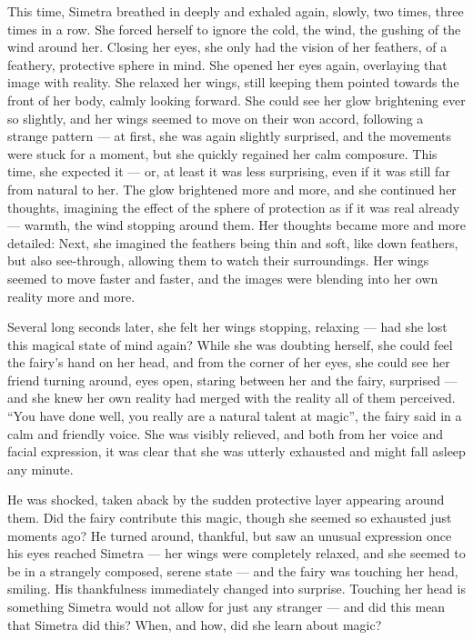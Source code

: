 This time, Simetra breathed in deeply and exhaled again, slowly, two times, three times in a row. She forced herself to ignore the cold, the wind, the gushing of the wind around her. Closing her eyes, she only had the vision of her feathers, of a feathery, protective sphere in mind. She opened her eyes again, overlaying that image with reality. She relaxed her wings, still keeping them pointed towards the front of her body, calmly looking forward. She could see her glow brightening ever so slightly, and her wings seemed to move on their won accord, following a strange pattern --- at first, she was again slightly surprised, and the movements were stuck for a moment, but she quickly regained her calm composure. This time, she expected it --- or, at least it was less surprising, even if it was still far from natural to her. The glow brightened more and more, and she continued her thoughts, imagining the effect of the sphere of protection as if it was real already --- warmth, the wind stopping around them. Her thoughts became more and more detailed: Next, she imagined the feathers being thin and soft, like down feathers, but also see-through, allowing them to watch their surroundings. Her wings seemed to move faster and faster, and the images were blending into her own reality more and more.

Several long seconds later, she felt her wings stopping, relaxing --- had she lost this magical state of mind again? While she was doubting herself, she could feel the fairy's hand on her head, and from the corner of her eyes, she could see her friend turning around, eyes open, staring between her and the fairy, surprised --- and she knew her own reality had merged with the reality all of them perceived. \enquote{You have done well, you really are a natural talent at magic}, the fairy said in a calm and friendly voice. She was visibly relieved, and both from her voice and facial expression, it was clear that she was utterly exhausted and might fall asleep any minute.

\fancybreaker{}

He was shocked, taken aback by the sudden protective layer appearing around them. Did the fairy contribute this magic, though she seemed so exhausted just moments ago? He turned around, thankful, but saw an unusual expression once his eyes reached Simetra --- her wings were completely relaxed, and she seemed to be in a strangely composed, serene state --- and the fairy was touching her head, smiling. His thankfulness immediately changed into surprise. Touching her head is something Simetra would not allow for just any stranger --- and did this mean that Simetra did this? When, and how, did she learn about magic?

